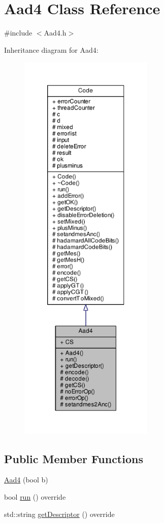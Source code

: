 \hypertarget{class_aad4}{}\section{Aad4 Class Reference}
\label{class_aad4}


{\ttfamily \#include $<$Aad4.\+h$>$}



Inheritance diagram for Aad4\+:
\nopagebreak
\begin{figure}[H]
\begin{center}
\leavevmode
\includegraphics[height=550pt]{class_aad4__inherit__graph}
\end{center}
\end{figure}
\subsection*{Public Member Functions}
\begin{DoxyCompactItemize}
\item 
\hyperlink{class_aad4_af5a8655a7236239eeaddd65fb04bbf98}{Aad4} (bool b)
\item 
bool \hyperlink{class_aad4_a95f5ec483584c48bde0fd96d4d347c34}{run} () override
\item 
std\+::string \hyperlink{class_aad4_ad697e56ab152cd1228bd26f73451ec42}{get\+Descriptor} () override
\end{DoxyCompactItemize}

